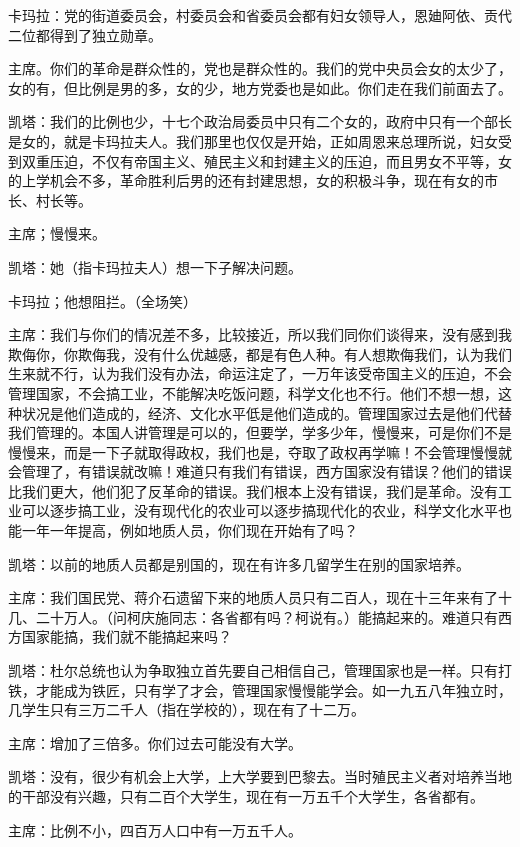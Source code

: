 卡玛拉：党的街道委员会，村委员会和省委员会都有妇女领导人，恩廸阿依、贡代二位都得到了独立勋章。

主席。你们的革命是群众性的，党也是群众性的。我们的党中央员会女的太少了，女的有，但比例是男的多，女的少，地方党委也是如此。你们走在我们前面去了。

凯塔：我们的比例也少，十七个政治局委员中只有二个女的，政府中只有一个部长是女的，就是卡玛拉夫人。我们那里也仅仅是开始，正如周恩来总理所说，妇女受到双重压迫，不仅有帝国主义、殖民主义和封建主义的压迫，而且男女不平等，女的上学机会不多，革命胜利后男的还有封建思想，女的积极斗争，现在有女的市长、村长等。

主席；慢慢来。

凯塔：她（指卡玛拉夫人）想一下子解决问题。

卡玛拉；他想阻拦。（全场笑）

主席：我们与你们的情况差不多，比较接近，所以我们同你们谈得来，没有感到我欺侮你，你欺侮我，没有什么优越感，都是有色人种。有人想欺侮我们，认为我们生来就不行，认为我们没有办法，命运注定了，一万年该受帝国主义的压迫，不会管理国家，不会搞工业，不能解决吃饭问题，科学文化也不行。他们不想一想，这种状况是他们造成的，经济、文化水平低是他们造成的。管理国家过去是他们代替我们管理的。本国人讲管理是可以的，但要学，学多少年，慢慢来，可是你们不是慢慢来，而是一下子就取得政权，我们也是，夺取了政权再学嘛！不会管理慢慢就会管理了，有错误就改嘛！难道只有我们有错误，西方国家没有错误？他们的错误比我们更大，他们犯了反革命的错误。我们根本上没有错误，我们是革命。没有工业可以逐步搞工业，没有现代化的农业可以逐步搞现代化的农业，科学文化水平也能一年一年提高，例如地质人员，你们现在开始有了吗？

凯塔：以前的地质人员都是别国的，现在有许多几留学生在别的国家培养。

主席：我们国民党、蒋介石遗留下来的地质人员只有二百人，现在十三年来有了十几、二十万人。（问柯庆施同志：各省都有吗？柯说有。）能搞起来的。难道只有西方国家能搞，我们就不能搞起来吗？

凯塔：杜尔总统也认为争取独立首先要自己相信自己，管理国家也是一样。只有打铁，才能成为铁匠，只有学了才会，管理国家慢慢能学会。如一九五八年独立时，几学生只有三万二千人（指在学校的），现在有了十二万。

主席：增加了三倍多。你们过去可能没有大学。

凯塔：没有，很少有机会上大学，上大学要到巴黎去。当时殖民主义者对培养当地的干部没有兴趣，只有二百个大学生，现在有一万五千个大学生，各省都有。

主席：比例不小，四百万人口中有一万五千人。

